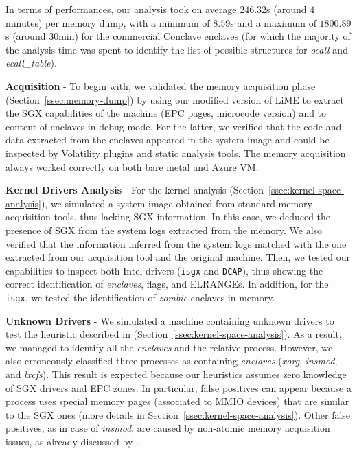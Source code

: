 In terms of performances, our analysis took on average $246.32$s
(around $4$ minutes) per memory dump, with a minimum of $8.59$s and a maximum of
$1800.89$s (around $30$min) for the commercial Conclave enclaves
(for which the  majority of the analysis time was spent to identify the
list of possible structures for \emph{ocall} and \emph{ecall\_table}).

\noindent
\textbf{Acquisition} - 
To begin with, we validated the memory acquisition phase 
(Section~\ref{ssec:memory-dump}) by using 
our modified version of LiME to extract the SGX capabilities of the 
machine (\eg EPC pages, microcode version) and to content of enclaves in debug 
mode.
For the latter, we verified that the code and data extracted from the 
enclaves appeared in the system image and could be inspected by
Volatility plugins and static analysis tools.
The memory acquisition always worked correctly on both bare metal and Azure VM.

\noindent
\textbf{Kernel Drivers Analysis} - 
For the kernel analysis (Section~\ref{ssec:kernel-space-analysis}), we 
simulated a 
system image obtained from standard memory acquisition tools, thus lacking SGX 
information.
In this case, we deduced the presence of SGX from the system logs extracted
from the memory. We also verified that the information inferred from the system 
logs matched 
with the one extracted from our acquisition tool and the original machine.
Then, we tested our capabilities to inspect both Intel drivers (\texttt{isgx} 
and \texttt{DCAP}), thus showing the correct identification of \emph{enclaves}, 
flags, and ELRANGEs.
In addition, for the \texttt{isgx}, we tested the identification of 
\emph{zombie} enclaves in memory.

\noindent
\textbf{Unknown Drivers} - 
We simulated a machine containing unknown drivers to test the heuristic 
described in (Section~\ref{ssec:kernel-space-analysis}). 
As a result, we managed to identify all the \emph{enclaves} and the relative 
process. 
However, we also erroneously classified three processes as containing 
\emph{enclaves} (\ie \emph{xorg}, \emph{insmod}, and \emph{lxcfs}).
This result is expected because our heuristics assumes zero knowledge of SGX 
drivers and EPC zones.
In particular, false positives can appear because a process uses special memory 
pages (\eg associated to MMIO devices) that are similar to the SGX ones (more 
details in Section~\ref{ssec:kernel-space-analysis}).
Other false positives, as in case of \emph{insmod}, are caused by non-atomic 
memory acquisition issues, as already discussed by \cite{pagani2019introducing}.

